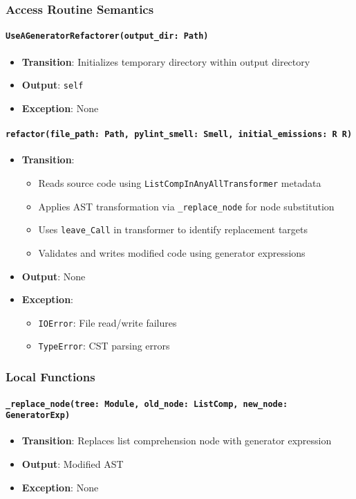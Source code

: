 \documentclass[12pt, titlepage]{article}
\begin{document}
\subsubsection{Access Routine Semantics}

\paragraph{\texttt{UseAGeneratorRefactorer(output\_dir: Path)}}
\begin{itemize}
\item \textbf{Transition}: Initializes temporary directory within output directory
\item \textbf{Output}: \texttt{self}
\item \textbf{Exception}: None
\end{itemize}

\paragraph{\texttt{refactor(file\_path: Path, pylint\_smell: Smell, initial\_emissions: 
R
R)}}
\begin{itemize}
\item \textbf{Transition}:
\begin{itemize}
\item Reads source code using \texttt{ListCompInAnyAllTransformer} metadata
\item Applies AST transformation via \texttt{\_replace\_node} for node substitution
\item Uses \texttt{leave\_Call} in transformer to identify replacement targets
\item Validates and writes modified code using generator expressions
\end{itemize}
\item \textbf{Output}: None
\item \textbf{Exception}:
\begin{itemize}
\item \texttt{IOError}: File read/write failures
\item \texttt{TypeError}: CST parsing errors
\end{itemize}
\end{itemize}

\subsubsection{Local Functions}

\paragraph{\texttt{\_replace\_node(tree: Module, old\_node: ListComp, new\_node: GeneratorExp)}}
\begin{itemize}
\item \textbf{Transition}: Replaces list comprehension node with generator expression
\item \textbf{Output}: Modified AST
\item \textbf{Exception}: None
\end{itemize}
\end{document}
